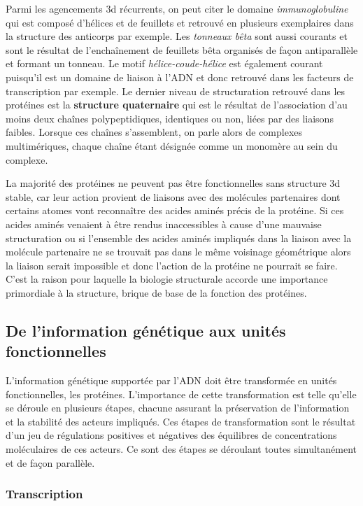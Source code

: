 Parmi les agencements 3d récurrents, on peut citer le domaine \textit{immunoglobuline} qui est composé d'hélices et de feuillets et retrouvé en plusieurs exemplaires dans la structure des anticorps par exemple. Les \textit{tonneaux bêta} sont aussi courants et sont le résultat de l’enchaînement de feuillets bêta organisés de façon antiparallèle et formant un tonneau. Le motif \textit{hélice-coude-hélice} est également courant puisqu'il est un domaine de liaison à l'ADN et donc retrouvé dans les facteurs de transcription par exemple.
Le dernier niveau de structuration retrouvé dans les protéines est la \textbf{structure quaternaire} qui est le résultat de l'association d'au moins deux chaînes polypeptidiques, identiques ou non, liées par des liaisons faibles. Lorsque ces chaînes s'assemblent, on parle alors de complexes multimériques, chaque chaîne étant désignée comme un monomère au sein du complexe.

La majorité des protéines ne peuvent pas être fonctionnelles sans structure 3d stable, car leur action provient de liaisons avec des molécules partenaires dont certains atomes vont reconnaître des acides aminés précis de la protéine. Si ces acides aminés venaient à être rendus inaccessibles à cause d'une mauvaise structuration ou si l'ensemble des acides aminés impliqués dans la liaison avec la molécule partenaire ne se trouvait pas dans le même voisinage géométrique alors la liaison serait impossible et donc l'action de la protéine ne pourrait se faire. C'est la raison pour laquelle la biologie structurale accorde une importance primordiale à la structure, brique de base de la fonction des protéines.


\subsection{De l'information génétique aux unités fonctionnelles} \label{trans_trad}

L'information génétique supportée par l'ADN doit être transformée en unités fonctionnelles, les protéines. L'importance de cette transformation est telle qu'elle se déroule en plusieurs étapes, chacune assurant la préservation de l'information et la stabilité des acteurs impliqués. Ces étapes de transformation sont le résultat d'un jeu de régulations positives et négatives des équilibres de concentrations moléculaires de ces acteurs. Ce sont des étapes se déroulant toutes simultanément et de façon parallèle.

\subsubsection{Transcription}

